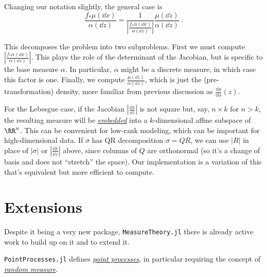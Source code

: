 \documentclass{juliacon}
\newcommand{\moritz}[2][] {\todo[inline,backgroundcolor=blue!10!white, size=\footnotesize,#1]{(Moritz) #2 }}
\begin{document}
Changing our notation slightly, the general case is
\[
\frac{f_*\mu(\dd x)}{\alpha(\dd z)} 
= \frac{1}{
    \left|
        \frac{
            f_*\alpha(\dd x)
        }{
            \alpha(\dd z)
        }
    \right|
}
\frac{\mu(\dd z)}{\alpha(\dd z)}\ .
\]

This decomposes the problem into two subproblems. First we must compute 
$\left|
    \frac{
        f_*\alpha(\dd x)
    }{
        \alpha(\dd z)
    }
\right|$.
This plays the role of the determinant of the Jacobian, but is specific to the base measure $\alpha$. In particular, $\alpha$ might be a discrete measure, in which case this factor is one. Finally, we compute $\frac{\mu(\dd z)}{\alpha(\dd z)}$, which is just the (pre-transformation) density, more familiar from previous discussion as $\frac{\dd \mu}{\dd \alpha}(z)$.

For the Lebesgue case, if the Jacobian $\left|\frac{\dd x}{\dd z}\right|$ is not square but, say, $n\times k$ for $n>k$, the resulting measure will be \href{https://en.wikipedia.org/wiki/Embedding}{\emph{embedded}} into a $k$-dimensional affine subspace of $\RR^n$. This can be convenient for low-rank modeling, which can be important for high-dimensional data. If $\sigma$ has QR decomposition $\sigma=Q R$, we can use $|R|$ in place of $|\sigma|$ or $\left|\frac{\dd x}{\dd z}\right|$ above, since columns of $Q$ are orthonormal (so it's a change of basis and does not ``stretch'' the space). Our implementation is a variation of this that's equivalent but more efficient to compute.



\section{Extensions}

Despite it being a very new package, \verb|MeasureTheory.jl| there is already active work to build up on it and to extend it.



\verb|PointProcesses.jl|\cite{Dalle_PointProcesses.jl} defines \href{https://en.wikipedia.org/wiki/Point_process}{\emph{point processes}}, in particular requiring the concept of \href{https://en.wikipedia.org/wiki/Random_measure}{\emph{random measure}}.
\end{document}
